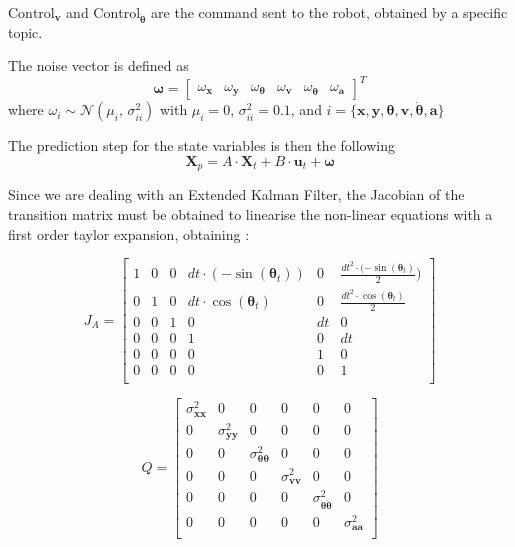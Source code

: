 $ \text{Control}_{\mathbf{v}}$ and  $\text{Control}_{\mathbf{\dot{\boldsymbol \theta}}}$ are the command sent to the robot, obtained by a specific topic.

The noise vector is defined as
\begin{equation}
\boldsymbol \omega
=
\begin{bmatrix}
\omega_{\mathbf{x}}  &
\omega_{\mathbf{y}} &
\omega_{\boldsymbol \theta}  &
\omega_{\mathbf{v}} &
\omega_{\dot{\boldsymbol \theta}} &
\omega_{\mathbf{a}}
\end{bmatrix} ^T
\end{equation}
where $\omega_i \sim \mathcal{N}(\mu_i,\,\sigma_{ii}^{2})$ with $\mu_i = 0$, $\sigma_{ii}^2 = 0.1$, and $ i = \{ \mathbf{x} , \mathbf{y} , \boldsymbol \theta , \mathbf{v} , \mathbf{\dot{\boldsymbol \theta}} , \mathbf{a} \}$

The prediction step for the state variables is then the following
\begin{equation}
\mathbf{X}_{p} = A \cdot \mathbf{X}_t + B \cdot \mathbf{u}_t + \boldsymbol \omega
\end{equation}

Since we are dealing with an Extended Kalman Filter, the Jacobian of the transition matrix must be obtained to linearise the non-linear equations with a first order taylor expansion, obtaining :

\begin{equation}
J_A
=
\begin{bmatrix}
1 & 0 & 0 & dt \cdot ( - \sin(\boldsymbol \theta_t)) & 0 & \frac{dt^2 \cdot ( - \sin(\boldsymbol \theta_t)}{2}) \\
0 & 1 & 0 & dt \cdot \cos(\boldsymbol \theta_t)& 0 & \frac{dt^2 \cdot \cos(\boldsymbol \theta_t)}{2} \\
0 & 0 & 1  & 0 & dt & 0 \\
0 & 0 & 0 & 1 & 0 & dt \\
0 & 0 & 0 & 0 & 1 & 0 \\
0 & 0 & 0 & 0 & 0 & 1 \\[0.3em]
\end{bmatrix}
\end{equation}

\begin{equation}
Q
=
\begin{bmatrix}
\sigma_{\mathbf{xx}}^2 & 0 & 0 & 0 & 0 & 0 \\
0 & \sigma_{\mathbf{yy}}^2 & 0 & 0 & 0 & 0 \\
0 & 0 & \sigma_{\mathbf{\boldsymbol \theta \boldsymbol \theta}}^2 & 0 & 0 & 0 \\
0 & 0 & 0 & \sigma_{\mathbf{vv}}^2 & 0 & 0 \\
0 & 0 & 0 & 0 & \sigma_{\mathbf{\dot{\boldsymbol \theta}\dot{\boldsymbol \theta}}}^2 & 0 \\
0 & 0 & 0 & 0 & 0 & \sigma_{\mathbf{aa}}^2 \\
\end{bmatrix}
\end{equation}

